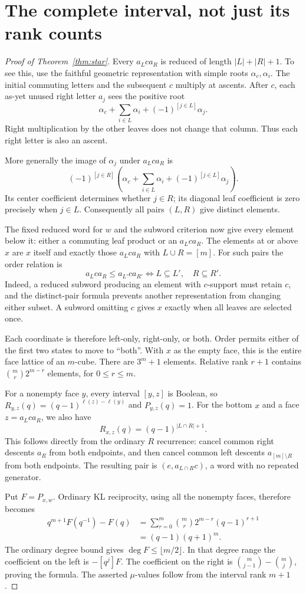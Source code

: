 \documentclass[11pt]{article}
\begin{document}
\section{The complete interval, not just its rank counts}
\begin{proof}[Proof of Theorem~\ref{thm:star}]
Every $a_Lca_R$ is reduced of length $|L|+|R|+1$. To see this, use the
faithful geometric representation with simple roots $\alpha_c,\alpha_i$.
The initial commuting letters and the subsequent $c$ multiply at ascents.
After $c$, each as-yet unused right letter $a_j$ sees the positive root
\[
 \alpha_c+\sum_{i\in L}\alpha_i+(-1)^{[j\in L]}\alpha_j.
\]
Right multiplication by the other leaves does not change that column.
Thus each right letter is also an ascent.

More generally the image of $\alpha_j$ under $a_Lca_R$ is
\[
 (-1)^{[j\in R]}
 \left(\alpha_c+\sum_{i\in L}\alpha_i+(-1)^{[j\in L]}\alpha_j\right).
\]
Its center coefficient determines whether $j\in R$; its diagonal leaf
coefficient is zero precisely when $j\in L$. Consequently all pairs
$(L,R)$ give distinct elements.

The fixed reduced word for $w$ and the subword criterion now give every
element below it: either a commuting leaf product or an $a_Lca_R$.
The elements at or above $x$ are $x$ itself and exactly those $a_Lca_R$
with $L\cup R=[m]$. For such pairs the order relation is
\[
 a_Lca_R\leq a_{L'}ca_{R'}\iff L\subseteq L',\quad R\subseteq R'.
\]
Indeed, a reduced subword producing an element with $c$-support must
retain $c$, and the distinct-pair formula prevents another representation
from changing either subset. A subword omitting $c$ gives $x$ exactly
when all leaves are selected once.

Each coordinate is therefore left-only, right-only, or both. Order permits
either of the first two states to move to ``both''. With $x$ as the empty
face, this is the entire face lattice of an $m$-cube. There are $3^m+1$
elements. Relative rank $r+1$ contains
$\binom mr2^{m-r}$ elements, for $0\leq r\leq m$.

For a nonempty face $y$, every interval $[y,z]$ is Boolean, so
$R_{y,z}(q)=(q-1)^{\ell(z)-\ell(y)}$ and $P_{y,z}(q)=1$.
For the bottom $x$ and a face $z=a_Lca_R$, we also have
\[
 R_{x,z}(q)=(q-1)^{|L\cap R|+1}.
\]
This follows directly from the ordinary $R$ recurrence: cancel common
right descents $a_R$ from both endpoints, and then cancel common left
descents $a_{[m]\setminus R}$ from both endpoints. The resulting pair is
$(e,a_{L\cap R}c)$, a word with no repeated generator.

Put $F=P_{x,w}$. Ordinary KL reciprocity, using all the nonempty faces,
therefore becomes
\begin{align*}
 q^{m+1}F(q^{-1})-F(q)
 &=\sum_{r=0}^m\binom mr2^{m-r}(q-1)^{r+1}\\
 &=(q-1)(q+1)^m.
\end{align*}
The ordinary degree bound gives $\deg F\leq\lfloor m/2\rfloor$.
In that degree range the coefficient on the left is $-[q^j]F$.
The coefficient on the right is $\binom m{j-1}-\binom mj$, proving
the formula. The asserted $\mu$-values follow from the interval rank $m+1$.
\end{proof}
\end{document}
